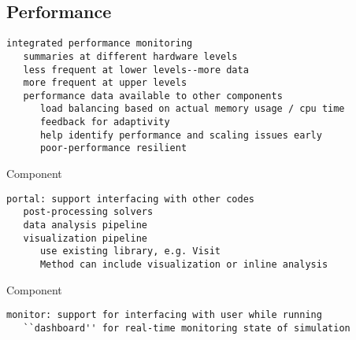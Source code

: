 \documentclass{article}
\begin{document}
\subsection{Performance} \label{ss:design-performance}

\begin{verbatim}
integrated performance monitoring
   summaries at different hardware levels
   less frequent at lower levels--more data
   more frequent at upper levels
   performance data available to other components
      load balancing based on actual memory usage / cpu time
      feedback for adaptivity
      help identify performance and scaling issues early
      poor-performance resilient
\end{verbatim}

 Component

\begin{verbatim}
portal: support interfacing with other codes
   post-processing solvers
   data analysis pipeline
   visualization pipeline
      use existing library, e.g. Visit
      Method can include visualization or inline analysis
\end{verbatim}

 Component

\begin{verbatim}
monitor: support for interfacing with user while running
   ``dashboard'' for real-time monitoring state of simulation
\end{verbatim}



\end{document}
